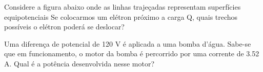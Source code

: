 \documentclass[12pt, addpoints]{exam}
\begin{document}
\begin{questions}
\begin{multicols*}{2}
\begin{oneparchoices}
\end{oneparchoices}
\question[20] Considere a figura abaixo onde as linhas trajeçadas representam superfícies equipotenciais Se colocarmos um elétron próximo a carga Q, quais trechos possíveis o elétron poderá se deslocar?
        
        \begin{center}
            \begin{minipage}[c]{0.5\linewidth}
            \end{minipage}
        \end{center}
        
        

\begin{oneparchoices}
\end{oneparchoices}
\question[20] Uma diferença de potencial de 120 V é aplicada a uma bomba d’água. Sabe-se que em funcionamento, o motor da bomba é percorrido por uma corrente de    3.52 A. Qual é a potência desenvolvida nesse motor?


\end{multicols*}
\end{questions}
\end{document}
